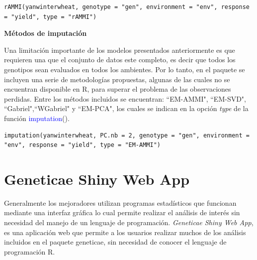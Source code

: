 \begin{tcolorbox}[skin=bicolor,
    colframe=aurometalsaurus,colback=backcolour,colbacklower=white,
    width=1\linewidth,
    height=0.1\linewidth,
    boxsep=-3mm]
\begin{lstlisting}
rAMMI(yanwinterwheat, genotype = "gen", environment = "env", response = "yield", type = "rAMMI")
\end{lstlisting}
\end{tcolorbox}



\textbf{Métodos de imputación}

Una limitación importante de los modelos presentados anteriormente es que requieren una que el conjunto de datos este completo, es decir que todos los genotipos sean evaluados en todos los ambientes. Por lo tanto, en el paquete se incluyen una serie de metodologías propuestas, algunas de las cuales no se encuentran disponible en R, para superar el problema de las observaciones perdidas. Entre los métodos incluidos se encuentran: ``EM-AMMI", ``EM-SVD", ``Gabriel",``WGabriel" y ``EM-PCA", los cuales se indican en la opción \emph{type} de la función \textcolor{blue}{imputation}().

\begin{tcolorbox}[skin=bicolor,
    colframe=aurometalsaurus,colback=backcolour,colbacklower=white,
    width=1\linewidth,
    height=0.1\linewidth,
    boxsep=-3mm]
\begin{lstlisting}
imputation(yanwinterwheat, PC.nb = 2, genotype = "gen", environment = "env", response = "yield", type = "EM-AMMI")
\end{lstlisting}
\end{tcolorbox}


\section{Geneticae Shiny Web App}

Generalmente los mejoradores utilizan programas estadísticos que funcionan mediante una interfaz gráfica lo cual permite realizar el análisis de interés sin necesidad del manejo de un lenguaje de programación. \emph{Geneticae Shiny Web App}, es una aplicación web que permite a los usuarios realizar muchos de los análisis incluidos en el paquete geneticae, sin necesidad de conocer el lenguaje de programación R. 

